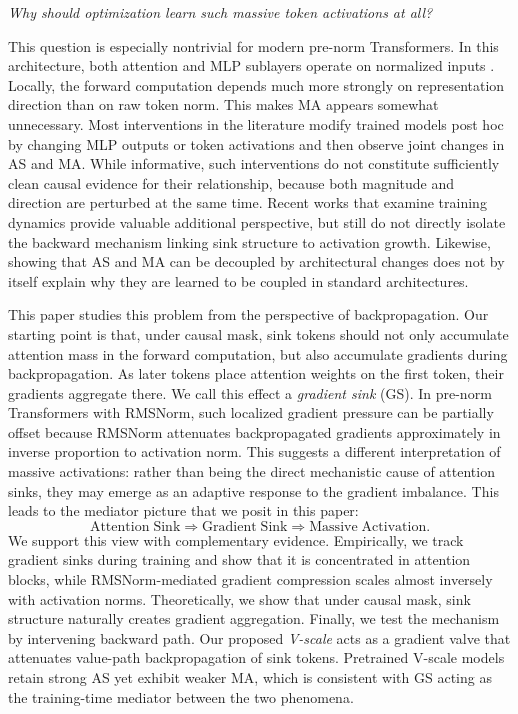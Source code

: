 \documentclass{article}
\theoremstyle{plain}
\theoremstyle{definition}
\theoremstyle{remark}
\begin{document}
\emph{Why should optimization learn such massive token activations at all?}

This question is especially nontrivial for modern pre-norm Transformers. In this architecture, both attention and MLP sublayers operate on normalized inputs \citep{zhang2019rmsnorm,xiong2020layernorm,touvron2023llama}. Locally, the forward computation depends much more strongly on representation direction than on raw token norm. This makes MA appears somewhat unnecessary. Most interventions in the literature modify trained models post hoc by changing MLP outputs or token activations and then observe joint changes in AS and MA. While informative, such interventions do not constitute sufficiently clean causal evidence for their relationship, because both magnitude and direction are perturbed at the same time. Recent works that examine training dynamics \citep{gallegofeliciano2026hiddendynamics,queipo-de-llano2026attention} provide valuable additional perspective, but still do not directly isolate the backward mechanism linking sink structure to activation growth. Likewise, showing that AS and MA can be decoupled by architectural changes \citep{sun2026spike} does not by itself explain why they are learned to be coupled in standard architectures.

This paper studies this problem from the perspective of backpropagation. Our starting point is that, under causal mask, sink tokens should not only accumulate attention mass in the forward computation, but also accumulate gradients during backpropagation. As later tokens place attention weights on the first token, their gradients aggregate there. We call this effect a \emph{gradient sink} (GS). In pre-norm Transformers with RMSNorm, such localized gradient pressure can be partially offset because RMSNorm attenuates backpropagated gradients approximately in inverse proportion to activation norm. This suggests a different interpretation of massive activations: rather than being the direct mechanistic cause of attention sinks, they may emerge as an adaptive response to the gradient imbalance. This leads to the mediator picture that we posit in this paper:
\[
\mathrm{Attention\;Sink} \Longrightarrow \mathrm{Gradient\;Sink} \Longrightarrow \mathrm{Massive\;Activation}.
\]
We support this view with complementary evidence. Empirically, we track gradient sinks during training and show that it is concentrated in attention blocks, while RMSNorm-mediated gradient compression scales almost inversely with activation norms. Theoretically, we show that under causal mask, sink structure naturally creates gradient aggregation. Finally, we test the mechanism by intervening backward path. Our proposed \emph{V-scale} acts as a gradient valve that attenuates value-path backpropagation of sink tokens. Pretrained V-scale models retain strong AS yet exhibit weaker MA, which is consistent with GS acting as the training-time mediator between the two phenomena.
\end{document}
